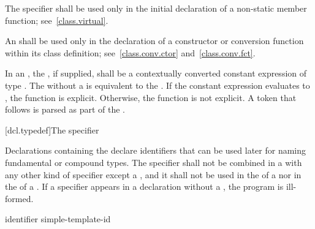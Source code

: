 \pnum
{}%
The  specifier shall be used only in the initial
declaration of a non-static member function; see~\ref{class.virtual}.

\pnum
{}%
An  shall be used only in the declaration of
a constructor or conversion function within its class definition;
see~\ref{class.conv.ctor} and~\ref{class.conv.fct}.

\pnum
In an ,
the , if supplied, shall be a
contextually converted constant expression of type .
The  
without a  is equivalent to
the  .
If the constant expression evaluates to ,
the function is explicit. Otherwise, the function is not explicit.
A \tcode{(} token that follows  is parsed as
part of the .

[dcl.typedef]{The  specifier}%

\pnum
Declarations containing the  
declare identifiers that can be used later for naming
fundamental or compound
types. The  specifier shall not be
combined in a  with any other kind of
specifier except a , and it shall not be used in the
 of a
 nor in the
 of a
.
If a  specifier appears in a declaration without a ,
the program is ill-formed.

\begin{bnf}
\br
    identifier\br
    simple-template-id
\end{bnf}

